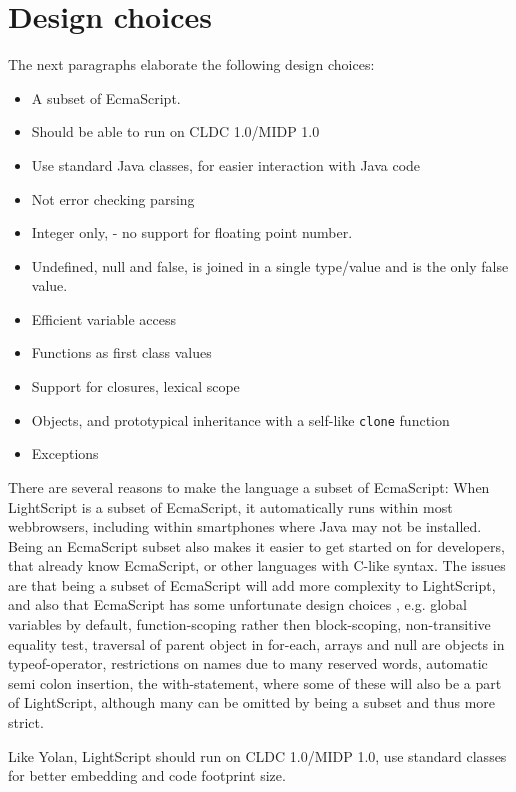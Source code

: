 \documentclass[11pt]{report}
\begin{document}
\section{Design choices}
The next paragraphs elaborate the following design choices:
\begin{itemize}
\item A subset of EcmaScript.
\item Should be able to run on CLDC 1.0/MIDP 1.0
\item Use standard Java classes, for easier interaction with Java code
\item Not error checking parsing
\item Integer only, - no support for floating point number.
\item Undefined, null and false, is joined in a single type/value and is the only false value.
\item Efficient variable access
\item Functions as first class values
\item Support for closures, lexical scope
\item Objects, and prototypical inheritance with a self-like \verb|clone| function
\item Exceptions
\end{itemize}

There are several reasons to make the language a subset of EcmaScript:
When LightScript is a subset of EcmaScript, it automatically runs within most webbrowsers, including within smartphones where Java may not be installed.
Being an EcmaScript subset also makes it easier to get started on for developers, that already know EcmaScript, or other languages with C-like syntax.
The issues are that being a subset of EcmaScript will add more complexity to LightScript, and also that EcmaScript has some unfortunate design choices \cite{crockford}, e.g. global variables by default, function-scoping rather then block-scoping, non-transitive equality test, traversal of parent object in for-each, arrays and null are objects in typeof-operator, restrictions on names due to many reserved words, automatic semi colon insertion, the with-statement, 
where some of these will also be a part of LightScript,
although many can be omitted by being a subset and thus more strict. 

Like Yolan, LightScript should run on CLDC 1.0/MIDP 1.0, use standard classes for better embedding and code footprint size.
\end{document}
